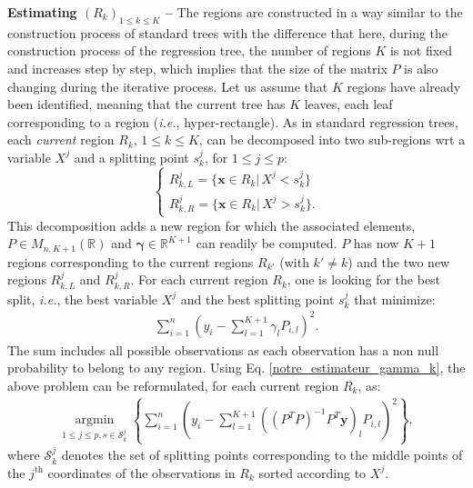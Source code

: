 \noindent \textbf{Estimating $(R_k)_{1 \le k \le K}$ --} The regions are constructed in a way similar to the construction process of standard trees with the difference that here, during the construction process of the regression tree, the number of regions $K$ is not fixed and increases step by step, which implies that the size of the matrix $P$ is also changing during the iterative process. Let us assume that $K$ regions have already been identified, meaning that the current tree has $K$ leaves, each leaf corresponding to a region (\textit{i.e.}, hyper-rectangle). 
As in standard regression trees, each \textit{current}  region $R_k, \, 1 \le k \le K$, can be decomposed into two sub-regions wrt a variable $X^j$ and a splitting point $s_k^j$, for $1\leq j \leq p$:
%
\begin{equation*}
\left\{
\begin{array}{l}
R^j_{k,L}=\{\boldsymbol{x}\in R_k|\, X^j<s_k^j \} \\
R^j_{k,R}=\{\boldsymbol{x} \in R_k|\,X^j>s_k^j\}.
\end{array}
\right.
\end{equation*}
%
This decomposition adds a new region  for which the associated elements, $P\in M_{n,K+1}(\mathbb{R})$ and  $\boldsymbol{\gamma} \in \mathbb{R}^{K+1}$ can readily be computed. $P$ has now $K+1$ regions corresponding to the current regions $R_{k'}$ (with $k' \ne k$) and the two new regions $R^j_{k,L}$ and $R^j_{k,R}$. For each current region $R_k$, one is looking for the best split, \textit{i.e.}, the best variable $X^j$ and the best splitting point $s^j_k$ that minimize:
%
\begin{align*}
\sum_{i=1}^n \left(y_i - \sum_{l=1}^{K+1} \gamma_l {P}_{i,l}\right)^2.
\end{align*}
%
The sum includes all possible observations as each observation has a non null probability to belong to any region. 
Using Eq. \eqref{notre_estimateur_gamma_k}, the above problem can be reformulated, for each current region $R_k$, as:
%
\begin{align}
\underset{1\leq j \leq p, s \in \mathcal{S}_k^j}{\operatorname{argmin}} \left\{  \sum_{i=1}^n \left(y_i - \sum_{l=1}^{K+1} \left(\left(P^T P\right)^{-1}  P^T  \boldsymbol{y}\right)_l {P}_{i,l}\right)^2 \right\},
\label{min-split}\end{align}
%
where $\mathcal{S}_k^j$ denotes the set of splitting points corresponding to the middle points of the $j^{\text{th}}$ coordinates of the observations in $R_k$ sorted according to $X^j$.

